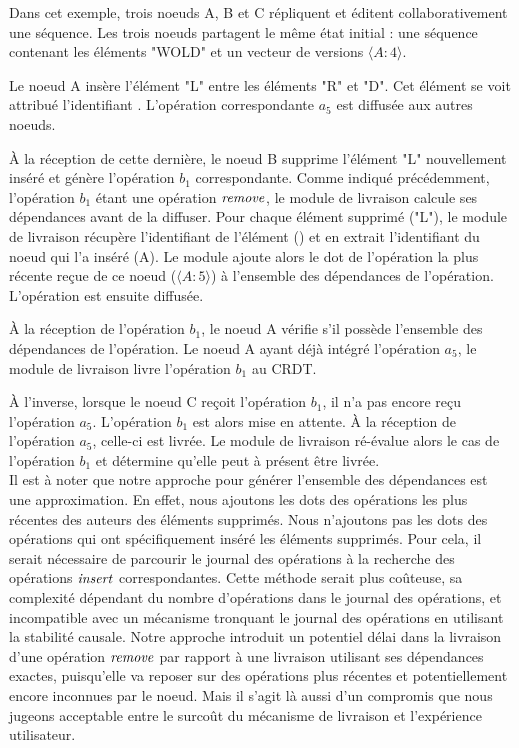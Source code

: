 Dans cet exemple, trois noeuds A, B et C répliquent et éditent collaborativement une séquence.
Les trois noeuds partagent le même état initial : une séquence contenant les éléments "WOLD" et un vecteur de versions $\langle A:4 \rangle$.

Le noeud A insère l'élément "L" entre les éléments "R" et "D".
Cet élément se voit attribué l'identifiant .
L'opération correspondante $a_5$ est diffusée aux autres noeuds.

À la réception de cette dernière, le noeud B supprime l'élément "L" nouvellement inséré et génère l'opération $b_1$ correspondante.
Comme indiqué précédemment, l'opération $b_1$ étant une opération $\mathit{remove}$, le module de livraison calcule ses dépendances avant de la diffuser.
Pour chaque élément supprimé ("L"), le module de livraison récupère l'identifiant de l'élément () et en extrait l'identifiant du noeud qui l'a inséré (A).
Le module ajoute alors le dot de l'opération la plus récente reçue de ce noeud ($\langle A:5 \rangle$) à l'ensemble des dépendances de l'opération.
L'opération est ensuite diffusée.

À la réception de l'opération $b_1$, le noeud A vérifie s'il possède l'ensemble des dépendances de l'opération.
Le noeud A ayant déjà intégré l'opération $a_5$, le module de livraison livre l'opération $b_1$ au \ac{CRDT}.

À l'inverse, lorsque le noeud C reçoit l'opération $b_1$, il n'a pas encore reçu l'opération $a_5$.
L'opération $b_1$ est alors mise en attente.
À la réception de l'opération $a_5$, celle-ci est livrée.
Le module de livraison ré-évalue alors le cas de l'opération $b_1$ et détermine qu'elle peut à présent être livrée.\\

Il est à noter que notre approche pour générer l'ensemble des dépendances est une approximation.
En effet, nous ajoutons les dots des opérations les plus récentes des auteurs des éléments supprimés.
Nous n'ajoutons pas les dots des opérations qui ont spécifiquement inséré les éléments supprimés.
Pour cela, il serait nécessaire de parcourir le journal des opérations à la recherche des opérations $\mathit{insert}$ correspondantes.
Cette méthode serait plus coûteuse, sa complexité dépendant du nombre d'opérations dans le journal des opérations, et incompatible avec un mécanisme tronquant le journal des opérations en utilisant la stabilité causale.
Notre approche introduit un potentiel délai dans la livraison d'une opération $\mathit{remove}$ par rapport à une livraison utilisant ses dépendances exactes, puisqu'elle va reposer sur des opérations plus récentes et potentiellement encore inconnues par le noeud.
Mais il s'agit là aussi d'un compromis que nous jugeons acceptable entre le surcoût du mécanisme de livraison et l'expérience utilisateur.
